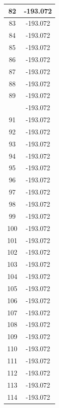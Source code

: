 \documentclass[12pt,a4paper]{article}
\numberwithin{equation}{section}
\numberwithin{figure}{section}
\numberwithin{table}{section}
\begin{document}
\begin{longtable}{|c|c|}
82 & -193.072 \\ \hline
83 & -193.072 \\ \hline
84 & -193.072 \\ \hline
85 & -193.072 \\ \hline
86 & -193.072 \\ \hline
87 & -193.072 \\ \hline
88 & -193.072 \\ \hline
89 & -193.072 \\ \hline
\pagebreak
90 & -193.072 \\ \hline
91 & -193.072 \\ \hline
92 & -193.072 \\ \hline
93 & -193.072 \\ \hline
94 & -193.072 \\ \hline
95 & -193.072 \\ \hline
96 & -193.072 \\ \hline
97 & -193.072 \\ \hline
98 & -193.072 \\ \hline
99 & -193.072 \\ \hline
100 & -193.072 \\ \hline
101 & -193.072 \\ \hline
102 & -193.072 \\ \hline
103 & -193.072 \\ \hline
104 & -193.072 \\ \hline
105 & -193.072 \\ \hline
106 & -193.072 \\ \hline
107 & -193.072 \\ \hline
108 & -193.072 \\ \hline
109 & -193.072 \\ \hline
110 & -193.072 \\ \hline
111 & -193.072 \\ \hline
112 & -193.072 \\ \hline
113 & -193.072 \\ \hline
114 & -193.072 \\ \hline
	\end{longtable}
	
\end{document}
